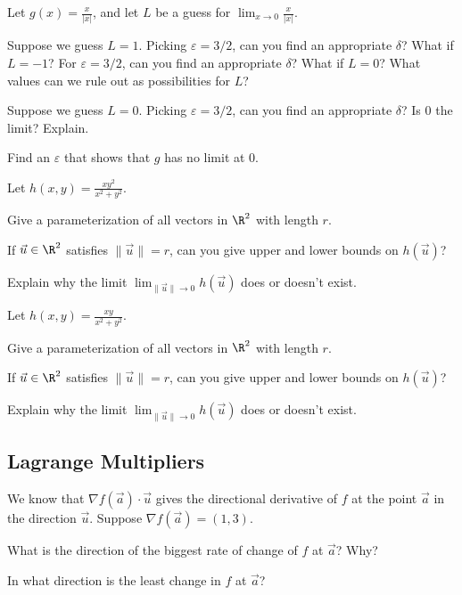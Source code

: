 \begin{question}
	Let $g(x) = \frac{x}{|x|}$, and let $L$ be a guess for $\lim_{x\to 0} \frac{x}{|x|}$.
	\begin{parts}
		\item Suppose we guess $L=1$.  Picking $\varepsilon = 3/2$, can you find an appropriate
			$\delta$?  What if $L=-1$?  For $\varepsilon=3/2$, can you find an appropriate $\delta$?
			What if $L=0$?  What values can we rule out as possibilities for $L$?
		\item Suppose we guess $L=0$.  Picking $\varepsilon=3/2$, can you find an appropriate $\delta$?
			Is $0$ the limit?  Explain.
		\item Find an $\varepsilon$ that shows that $g$ has no limit at $0$.
	\end{parts}
\end{question}

\begin{question}
	Let $h(x,y) = \frac{xy^2}{x^2+y^2}$.
	\begin{parts}
		\item Give a parameterization of all vectors in $\R^2$ with length $r$.
		\item If $\vec u\in \R^2$ satisfies $\|\vec u\|=r$, can you give upper
			and lower bounds on $h(\vec u)$?
		\item Explain why the limit $\displaystyle \lim_{\|\vec u\|\to 0} h(\vec u)$
			does or doesn't exist.
	\end{parts}
\end{question}

\begin{question}
	Let $h(x,y) = \frac{xy}{x^2+y^2}$.
	\begin{parts}
		\item Give a parameterization of all vectors in $\R^2$ with length $r$.
		\item If $\vec u\in \R^2$ satisfies $\|\vec u\|=r$, can you give upper
			and lower bounds on $h(\vec u)$?
		\item Explain why the limit $\displaystyle \lim_{\|\vec u\|\to 0} h(\vec u)$
			does or doesn't exist.
	\end{parts}
\end{question}


\subsection*{Lagrange Multipliers}

\begin{question}
	We know that $\nabla f(\vec a)\cdot \vec u$ gives the directional derivative
	of $f$ at the point $\vec a$ in the direction $\vec u$.  Suppose
	$\nabla f(\vec a) = (1,3)$.
	\begin{parts}
		\item What is the direction of the biggest rate of change of $f$ at $\vec a$? Why?
		\item In what direction is the least change in $f$ at $\vec a$?
	\end{parts}
\end{question}


